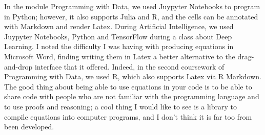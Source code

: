 \documentclass{article}
\begin{document}
In the module Programming with Data, we used Juypyter Notebooks to program in Python; however, it also supports Julia and R, and the cells can be annotated with Markdown and render Latex. During Artificial Intelligence, we used Juypyter Notebooks, Python and TensorFlow during a class about Deep Learning. I noted the difficulty I was having with producing equations in Microsoft Word, finding writing them in Latex a better alternative to the drag-and-drop interface that it offered. Indeed, in the second coursework of Programming with Data, we used  R, which also supports Latex via R Markdown. The good thing about being able to use equations in your code is to be able to share code with people who are not familiar with the programming language and to use proofs and reasoning; a cool thing I would like to see is a library to compile equations into computer programs, and I don't think it is far too from been developed.

\newpage

 
\end{document}
